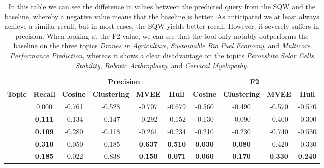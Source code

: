 \begin{table}
	\caption{In this table we can see the difference in values between the predicted query from the SQW and the baseline, whereby a negative value means that the baseline is better. As anticipated we at least always achieve a similar recall, but in most cases, the SQW yields better recall. However, it severely suffers in precision. When looking at the F2 value, we can see that the tool only notably outperforms the baseline on the three topics \textit{Drones in Agriculture}, \textit{Sustainable Bio Fuel Economy}, and \textit{Multicore Performance Prediction}, whereas it shows a clear disadvantage on the topics \textit{Perovskite Solar Cells Stability}, \textit{Robotic Arthroplasty}, and \textit{Cervical Myelopathy}.}
	\tiny
	\centering
	\hspace*{-1cm}
	\begin{tabular}{p{3cm}c|cccc|cccc}
		& & \multicolumn{4}{c|}{\textbf{Precision}} & \multicolumn{4}{c}{\textbf{F2}} \\ \cline{1-10}
		\multicolumn{1}{c}{\centering \textbf{Topic}} &
		\multicolumn{1}{p{1cm}|}{\centering \textbf{Recall}} &
		\multicolumn{1}{p{0.8cm}}{\centering \textbf{Cosine}} &
		\multicolumn{1}{p{1.2cm}}{\centering \textbf{Clustering}} & 
		\multicolumn{1}{p{0.8cm}}{\centering \textbf{MVEE}} & 
		\multicolumn{1}{p{0.8cm}|}{\centering \textbf{Hull}} & 
		\multicolumn{1}{p{0.8cm}}{\centering \textbf{Cosine}} & 
		\multicolumn{1}{p{1.2cm}}{\centering \textbf{Clustering}} & 
		\multicolumn{1}{p{0.8cm}}{\centering \textbf{MVEE}}  & 
		\multicolumn{1}{p{0.8cm}}{\centering \textbf{Hull}}  \\ \hline 
		\centering{Robotic Arthroplasty} & 0.000 &  -0.761 &  -0.528 &  -0.707 &  -0.679 &  -0.560 &  -0.490 &  -0.570 &  -0.570 \\
		\centering{Soft Robotics} & \textbf{0.111} &  -0.134 &  -0.147 &  -0.292 &  -0.152 &  -0.130 &  -0.090 &  -0.400 &  -0.300 \\
		\centering{Crop Yield Prediction} & \textbf{0.109} &  -0.280 &  -0.118 &  -0.261 &  -0.234 &  -0.210 &  -0.230 &  -0.740 &  -0.530 \\
		\centering{Synthetic Biology} & \textbf{0.310} &  -0.050 &  -0.185 & \textbf{0.637} & \textbf{0.510} & \textbf{0.030} & \textbf{0.080} &  -0.420 &  -0.330 \\
		\centering{Resilience in Business and management} & \textbf{0.185} &  -0.022 &  -0.838 & \textbf{0.150} & \textbf{0.071} & \textbf{0.060} & \textbf{0.170} & \textbf{0.330} & \textbf{0.240} \\

\end{tabular}
\end{table}
